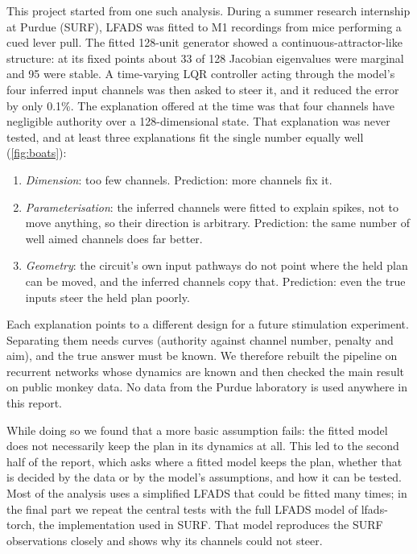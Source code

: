 \documentclass[11pt,a4paper]{article}
\begin{document}
This project started from one such analysis. During a summer research internship at Purdue (SURF), LFADS was fitted to M1 recordings from mice performing a cued lever pull. The fitted 128-unit generator showed a continuous-attractor-like structure: at its fixed points about 33 of 128 Jacobian eigenvalues were marginal and 95 were stable. A time-varying LQR controller acting through the model's four inferred input channels was then asked to steer it, and it reduced the error by only 0.1\%. The explanation offered at the time was that four channels have negligible authority over a 128-dimensional state. That explanation was never tested, and at least three explanations fit the single number equally well (\cref{fig:boats}):
\begin{enumerate}
  \item \emph{Dimension}: too few channels. Prediction: more channels fix it.
  \item \emph{Parameterisation}: the inferred channels were fitted to explain spikes, not to move anything, so their direction is arbitrary. Prediction: the same number of well aimed channels does far better.
  \item \emph{Geometry}: the circuit's own input pathways do not point where the held plan can be moved, and the inferred channels copy that. Prediction: even the true inputs steer the held plan poorly.
\end{enumerate}
Each explanation points to a different design for a future stimulation experiment. Separating them needs curves (authority against channel number, penalty and aim), and the true answer must be known. We therefore rebuilt the pipeline on recurrent networks whose dynamics are known and then checked the main result on public monkey data. No data from the Purdue laboratory is used anywhere in this report.

While doing so we found that a more basic assumption fails: the fitted model does not necessarily keep the plan in its dynamics at all. This led to the second half of the report, which asks where a fitted model keeps the plan, whether that is decided by the data or by the model's assumptions, and how it can be tested. Most of the analysis uses a simplified LFADS that could be fitted many times; in the final part we repeat the central tests with the full LFADS model of lfads-torch, the implementation used in SURF. That model reproduces the SURF observations closely and shows why its channels could not steer.
\end{document}
